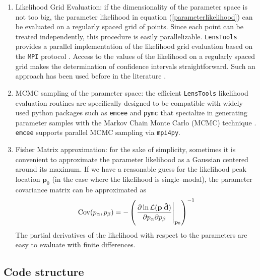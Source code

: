 \documentclass[5p]{elsarticle}
\newcommand{\bb}[1]{\mathbf{#1}}
\newcommand{\bbh}[1]{\mathbf{\hat{#1}}}
\newcommand{\ttt}[1]{\texttt{#1}}
\newcommand{\LT}{\texttt{LensTools} }
\begin{document}
\begin{enumerate}

\item Likelihood Grid Evaluation: if the dimensionality of the parameter space is not too big, the parameter likelihood in equation (\ref{parameterlikelihood}) can be evaluated on a regularly spaced grid of points. Since each point can be treated independently, this procedure is easily parallelizable. \LT provides a parallel implementation of the likelihood grid evaluation based on the \ttt{MPI} protocol \citep{MPI}. Access to the values of the likelihood on a regularly spaced grid makes the determination of confidence intervals straightforward. Such an approach has been used before in the literature \citep{cfhtpeaks,cfhtmink}.    

\item MCMC sampling of the parameter space: the efficient \LT likelihood evaluation routines are specifically designed to be compatible with widely used {\sc python} packages such as \ttt{emcee} \citep{emcee} and \ttt{pymc} \citep{pymc} that specialize in generating parameter samples with the Markov Chain Monte Carlo (MCMC) technique \citep{mcmc}. \ttt{emcee} supports parallel MCMC sampling via \ttt{mpi4py}.    

\item Fisher Matrix approximation: for the sake of simplicity, sometimes it is convenient to approximate the parameter likelihood as a Gaussian centered around its maximum. If we have a reasonable guess for the likelihood peak location $\bb{p}_0$ (in the case where the likelihood is single--modal), the parameter covariance matrix can be approximated as 
\begin{equation}
{\rm Cov}(p_\alpha,p_\beta) = -\left(\left.\frac{\partial\ln\mathcal{L}(\bb{p}\vert\bbh{d})}{\partial p_\alpha\partial p_\beta}\right\vert_{\bb{p}_0}\right)^{-1}
\end{equation}
%
The partial derivatives of the likelihood with respect to the parameters are easy to evaluate with finite differences. 
\end{enumerate}

\subsection{Code structure}
\end{document}
